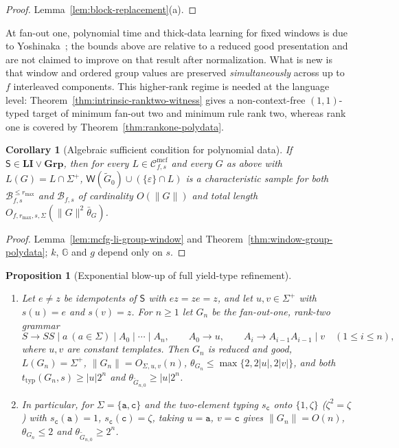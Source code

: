 \documentclass[11pt]{article}
\numberwithin{equation}{section}
\theoremstyle{plain}
\newtheorem{proposition}[theorem]{Proposition}
\newtheorem{corollary}[theorem]{Corollary}
\theoremstyle{definition}
\theoremstyle{remark}
\newcommand{\Wit}{\mathsf{W}}
\newcommand{\Cmcf}[2]{\mathcal{C}^{\mathrm{mcf}}_{#1,#2}}
\newcommand{\eps}{\varepsilon}
\theoremstyle{plain}
\begin{document}
\begin{proof}
Lemma~\ref{lem:block-replacement}(a).
\end{proof}

At fan-out one, polynomial time and thick-data learning for fixed windows is due
to Yoshinaka~\cite[Theorem~1]{Yoshinaka2008}; the bounds above are relative to a
reduced good presentation and are not claimed to improve on that result after
normalization.  What is new is that window and ordered group values are preserved
\emph{simultaneously} across up to $f$ interleaved components.  This higher-rank
regime is needed at the language level: Theorem~\ref{thm:intrinsic-ranktwo-witness}
gives a non-context-free $(1,1)$-typed target of minimum fan-out two and minimum
rule rank two, whereas rank one is covered by Theorem~\ref{thm:rankone-polydata}.

\begin{corollary}[Algebraic sufficient condition for polynomial data]
\label{cor:mcfg-li-group-polydata}
If $\mathsf S\in\mathbf{LI}\vee\mathbf{Grp}$, then for every $L\in\Cmcf{f}{s}$ and
every $G$ as above with $L(G)=L\cap\Sigma^+$, $\Wit(\widetilde G_0)\cup(\{\eps\}\cap L)$
is a characteristic sample for both $\mathcal B^{\le r_{\max}}_{f,s}$ and
$\mathcal B_{f,s}$ of cardinality
$O(\|G\|)$ and total length $O_{f,r_{\max},s,\Sigma}(\|G\|^2\bar\theta_G)$.
\end{corollary}

\begin{proof}
Lemma~\ref{lem:mcfg-li-group-window} and
Theorem~\ref{thm:window-group-polydata}; $k$, ${\mathbb G}$ and $g$ depend only on $s$.
\end{proof}

\begin{proposition}[Exponential blow-up of full yield-type refinement]
\label{prop:typed-thickness-exponential-v1s}
\begin{enumerate}[label=\textup{(\alph*)},leftmargin=*]
\item Let $e\ne z$ be idempotents of $\mathsf S$ with $ez=ze=z$, and let
$u,v\in\Sigma^+$ with $s(u)=e$ and $s(v)=z$.  For $n\ge1$ let $G_n$ be the
fan-out-one, rank-two grammar
\[
 S\to SS\mid a\ (a\in\Sigma)\mid A_0\mid\cdots\mid A_n,\qquad
 A_0\to u,\qquad
 A_i\to A_{i-1}A_{i-1}\mid v\quad(1\le i\le n),
\]
where $u,v$ are constant templates.  Then $G_n$ is reduced and good,
$L(G_n)=\Sigma^+$, $\|G_n\|=O_{\Sigma,u,v}(n)$,
$\theta_{G_n}\le\max\{2,2|u|,2|v|\}$, and both
$t_{\mathrm{typ}}(G_n,s)\ge|u|2^n$ and
$\theta_{\widetilde G_{n,0}}\ge|u|2^n$.
\item In particular, for $\Sigma=\{\mathtt a,\mathtt c\}$ and the two-element
typing $s_{\mathtt c}$ onto $\{1,\zeta\}$ ($\zeta^2=\zeta$) with
$s_{\mathtt c}(\mathtt a)=1$, $s_{\mathtt c}(\mathtt c)=\zeta$, taking $u=\mathtt a$,
$v=\mathtt c$ gives $\|G_n\|=O(n)$, $\theta_{G_n}\le2$ and
$\theta_{\widetilde G_{n,0}}\ge2^n$.
\end{enumerate}
\end{proposition}
\end{document}
